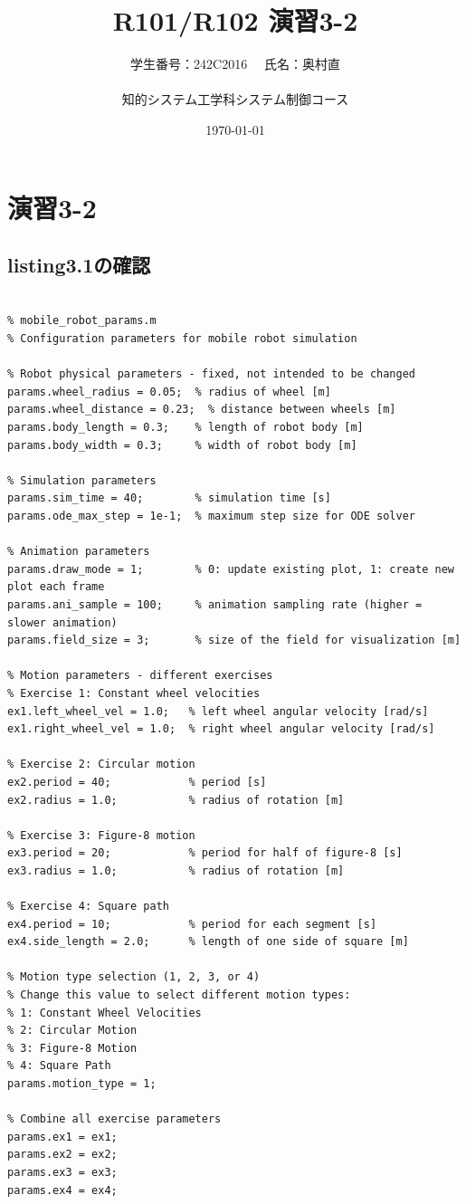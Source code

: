 \documentclass[10pt,a4paper,titlepage]{jreport} %
\title{R101/R102 演習3-2} %
\author{
  学生番号：242C2016 　氏名：奥村直 \\
  \\
  知的システム工学科システム制御コース
  } %
\date{\today} %
\begin{document}
\maketitle

\chapter{演習3-2}

\section{listing3.1の確認}

\begin{lstlisting}[caption=Listing3.1の確認]

% mobile_robot_params.m
% Configuration parameters for mobile robot simulation

% Robot physical parameters - fixed, not intended to be changed
params.wheel_radius = 0.05;  % radius of wheel [m]
params.wheel_distance = 0.23;  % distance between wheels [m]
params.body_length = 0.3;    % length of robot body [m]
params.body_width = 0.3;     % width of robot body [m]

% Simulation parameters
params.sim_time = 40;        % simulation time [s]
params.ode_max_step = 1e-1;  % maximum step size for ODE solver

% Animation parameters
params.draw_mode = 1;        % 0: update existing plot, 1: create new plot each frame
params.ani_sample = 100;     % animation sampling rate (higher = slower animation)
params.field_size = 3;       % size of the field for visualization [m]

% Motion parameters - different exercises
% Exercise 1: Constant wheel velocities
ex1.left_wheel_vel = 1.0;   % left wheel angular velocity [rad/s]
ex1.right_wheel_vel = 1.0;  % right wheel angular velocity [rad/s]

% Exercise 2: Circular motion
ex2.period = 40;            % period [s]
ex2.radius = 1.0;           % radius of rotation [m]

% Exercise 3: Figure-8 motion
ex3.period = 20;            % period for half of figure-8 [s]
ex3.radius = 1.0;           % radius of rotation [m]

% Exercise 4: Square path
ex4.period = 10;            % period for each segment [s]
ex4.side_length = 2.0;      % length of one side of square [m]

% Motion type selection (1, 2, 3, or 4)
% Change this value to select different motion types:
% 1: Constant Wheel Velocities
% 2: Circular Motion
% 3: Figure-8 Motion
% 4: Square Path
params.motion_type = 1;

% Combine all exercise parameters
params.ex1 = ex1;
params.ex2 = ex2; 
params.ex3 = ex3;
params.ex4 = ex4;

\end{lstlisting}
\end{document}
